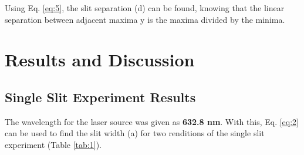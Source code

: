 \documentclass[12pt]{article}
\begin{document}
Using Eq. \ref{eq:5}, the slit separation (d) can be found, knowing that the linear separation between adjacent maxima y is the maxima divided by the minima.

\section{Results and Discussion} \label{sec:3}

\subsection{Single Slit Experiment Results}

The wavelength for the laser source was given as \textbf{632.8 nm}. With this, Eq. \ref{eq:2} can be used to find the slit width (a) for two renditions of the single slit experiment (Table \ref{tab:1}).

\begin{table}[H]
    \caption{Table of results for 2 single slits.}
    \label{tab:1}
\end{table}
\end{document}
